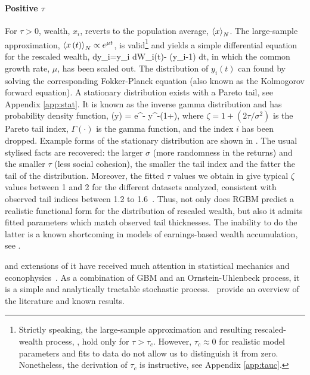 \paragraph{Positive $\tau$}
For $\tau>0$, wealth, $x_i$, reverts to the population average, $\left\langle x \right\rangle_N$. The large-sample approximation, $\left\langle x\left(t\right) \right\rangle_N \propto e^{\mu t}$, is valid\footnote{Strictly speaking, the large-sample approximation and resulting rescaled-wealth process, , hold only for $\tau>\tau_c$. However, $\tau_c \approx 0$ for realistic model parameters and fits to data do not allow us to distinguish it from zero. Nonetheless, the derivation of $\tau_c$ is instructive, see Appendix \ref{app:tauc}.} and yields a simple differential equation for the rescaled wealth,
\be
dy_i=y_i \sigma dW_i\left(t\right)- \tau (y_i-1) dt,
\ee
in which the common growth rate, $\mu$, has been scaled out. The distribution of $y_i\left(t\right)$ can found by solving the corresponding Fokker-Planck equation (also known as the Kolmogorov forward equation). A stationary distribution exists with a Pareto tail, see Appendix \ref{app:stat}. It is known as the inverse gamma distribution and has probability density function,
\be
{}\left(y\right) = \frac{\left(\zeta-1\right)^\zeta}{\Gamma\left(\zeta\right)} e^{-} y^{-\left(1+\zeta\right)},
\ee
where $\zeta=1+\left(2\tau/\sigma^2\right)$ is the Pareto tail index, $\Gamma\left(\cdot\right)$ is the gamma function, and the index $i$ has been dropped. Example forms of the stationary distribution are shown in . The usual stylised facts are recovered: the larger $\sigma$ (more randomness in the returns) and the smaller $\tau$ (less social cohesion), the smaller the tail index and the fatter the tail of the distribution. Moreover, the fitted $\tau$ values we obtain in  give typical $\zeta$ values between 1 and 2 for the different datasets analyzed, consistent with observed tail indices between 1.2 to 1.6~\cite{klass2006forbes,gabaix2009power,brzezinski2014wealth,vermeulen2017fat}. Thus, not only does RGBM predict a realistic functional form for the distribution of rescaled wealth, but also it admits fitted parameters which match observed tail thicknesses. The inability to do the latter is a known shortcoming in models of earnings-based wealth accumulation, see .

 and extensions of it have received much attention in statistical mechanics and econophysics~\cite{BouchaudMezard2000,Bouchaud2015}. As a combination of GBM and an Ornstein-Uhlenbeck process, it is a simple and analytically tractable stochastic process.~\cite{LiuSerota2016} provide an overview of the literature and known results.

